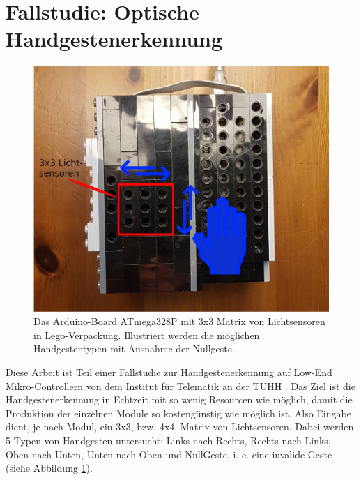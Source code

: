 \section{Fallstudie: Optische Handgestenerkennung}
\begin{figure}
    \centering
    \includegraphics[width=0.6\linewidth]{images/arduino_ex.png}
    \caption{Das Arduino-Board ATmega328P mit 3x3 Matrix von Lichtsensoren in Lego-Verpackung. Illustriert werden die möglichen Handgestentypen mit Ausnahme der Nullgeste.}
    \label{fig:arduino_ex}
\end{figure}
Diese Arbeit ist Teil einer Fallstudie zur Handgestenerkennung auf Low-End Mikro-Controllern von dem Institut für Telematik an der TUHH \cite{venzkeArticle}. Das Ziel ist die Handgestenerkennung in Echtzeit mit so wenig
Resourcen wie möglich, damit die Produktion der einzelnen Module so kostengünstig wie möglich ist. Also Eingabe dient, je nach Modul, ein 3x3, bzw. 4x4, Matrix von Lichtsensoren. Dabei werden 5 Typen von Handgesten
untersucht: Links nach Rechts, Rechts nach Links, Oben nach Unten, Unten nach Oben und NullGeste, i. e. eine invalide Geste (siehe Abbildung \ref{fig:arduino_ex}).